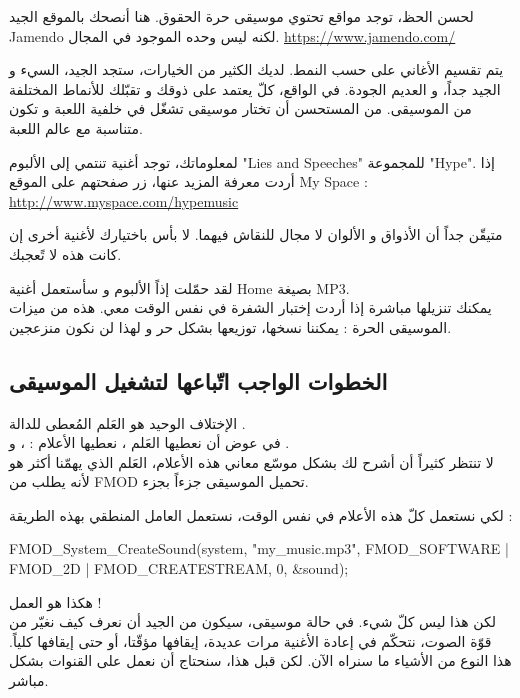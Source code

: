 لحسن الحظ، توجد مواقع تحتوي موسيقى حرة الحقوق. هنا أنصحك بالموقع الجيد
\textenglish{Jamendo}
لكنه ليس وحده الموجود في المجال.
\url{https://www.jamendo.com/}

يتم تقسيم الأغاني على حسب النمط. لديك الكثير من الخيارات، ستجد الجيد، السيء و الجيد جداً، و العديم الجودة. في الواقع، كلّ يعتمد على ذوقك و تقبّلك للأنماط المختلفة من الموسيقى. من المستحسن أن تختار موسيقى تشغّل في خلفية اللعبة و تكون متناسبة مع عالم اللعبة.

لمعلوماتك، توجد أغنية تنتمي إلى الألبوم
"\textenglish{Lies and Speeches}"
للمجموعة
"\textenglish{Hype}".
إذا أردت معرفة المزيد عنها، زر صفحتهم على الموقع
\textenglish{My Space} :
\url{http://www.myspace.com/hypemusic}

\begin{information}
متيقّن جداً أن الأذواق و الألوان لا مجال للنقاش فيهما. لا بأس باختيارك لأغنية أخرى إن كانت هذه لا تًعجبك.
\end{information}

لقد حمّلت إذاً الألبوم و سأستعمل أغنية
\textenglish{Home}
بصيغة
\textenglish{MP3}.\\
يمكنك تنزيلها مباشرة إذا أردت إختبار الشفرة في نفس الوقت معي. هذه من ميزات الموسيقى الحرة : يمكننا نسخها، توزيعها بشكل حر و لهذا لن نكون منزعجين.

\subsection{الخطوات الواجب اتّباعها لتشغيل الموسيقى}

الإختلاف الوحيد هو العَلم المُعطى للدالة
.\\
في عوض أن نعطيها العَلم
،
نعطيها الأعلام :
،  و .\\
لا تنتظر كثيراً أن أشرح لك بشكل موسّع معاني هذه الأعلام، العَلم الذي يهمّنا أكثر هو
لأنه يطلب من
\textenglish{FMOD}
تحميل الموسيقى جزءاً بجزء.

لكي نستعمل كلّ هذه الأعلام في نفس الوقت، نستعمل العامل المنطقي
\InlineCode{|}
بهذه الطريقة :

\begin{Csource}
FMOD_System_CreateSound(system, "my_music.mp3", FMOD_SOFTWARE | FMOD_2D | FMOD_CREATESTREAM, 0, &sound);
\end{Csource}

هكذا هو العمل  !\\
لكن هذا ليس كلّ شيء. في حالة موسيقى، سيكون من الجيد أن نعرف كيف نغيّر من قوّة الصوت، نتحكّم في إعادة الأغنية مرات عديدة، إيقافها مؤقّتا، أو حتى إيقافها كلياً. هذا النوع من الأشياء ما سنراه الآن. لكن قبل هذا، سنحتاج أن نعمل على القنوات بشكل مباشر.

